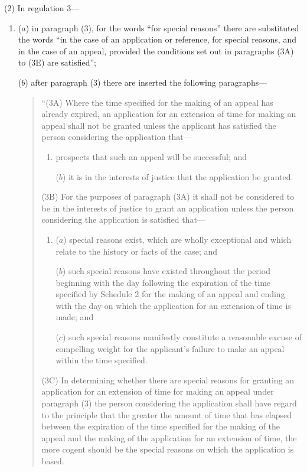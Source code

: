 \documentclass[a4paper]{article}
\begin{document}
(2) In regulation 3—
\begin{enumerate}\item[]
($a$) in paragraph (3), for the words “for special reasons” there are substituted the words “in the case of an application or reference, for special reasons, and in the case of an appeal, provided the conditions set out in paragraphs (3A) to (3E) are satisfied”;

($b$) after paragraph (3) there are inserted the following paragraphs—
\begin{quotation}
“(3A) Where the time specified for the making of an appeal has already expired, an application for an extension of time for making an appeal shall not be granted unless the applicant has satisfied the person considering the application that—
\begin{enumerate}\item[]
\begin{sloppypar}
 prospects that such an appeal will be successful; and
\end{sloppypar}

($b$) it is in the interests of justice that the application be granted.
\end{enumerate}

(3B) For the purposes of paragraph (3A) it shall not be considered to be in the interests of justice to grant an application unless the person considering the application is satisfied that—
\begin{enumerate}\item[]
($a$) special reasons exist, which are wholly exceptional and which relate to the history or facts of the case; and

($b$) such special reasons have existed throughout the period beginning with the day following the expiration of the time specified by Schedule 2 for the making of an appeal and ending with the day on which the application for an extension of time is made; and

($c$) such special reasons manifestly constitute a reasonable excuse of compelling weight for the applicant’s failure to make an appeal within the time specified.
\end{enumerate}

(3C) In determining whether there are special reasons for granting an application for an extension of time for making an appeal under paragraph (3) the person considering the application shall have regard to the principle that the greater the amount of time that has elapsed between the expiration of the time specified for the making of the appeal and the making of the application for an extension of time, the more cogent should be the special reasons on which the application is based.


\end{quotation}
\end{enumerate}
\end{document}
